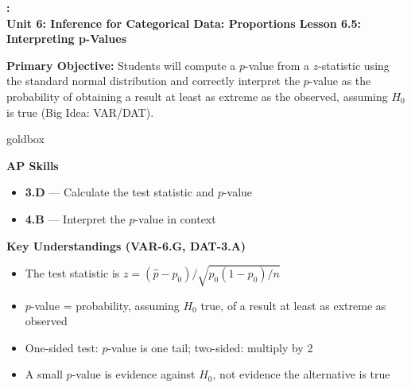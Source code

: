 \documentclass[10pt]{article}
\newcommand{\UnitNumberName}{Unit 6: Inference for Categorical Data: Proportions \quad}
\newcommand{\LessonNumberName}{Lesson 6.5: Interpreting p-Values}
\begin{document}
\begin{center}
    {\Large\bfseries \CourseName: \SchoolYear \\
    {\small\bfseries \UnitNumberName \LessonNumberName}}
\end{center}

\begin{tcolorbox}[colback=sky, colframe=navy, boxrule=0.9pt, arc=2mm,
    left=2mm, right=2mm, top=1.5mm, bottom=1.5mm]
    \textbf{Primary Objective:} Students will compute a $p$-value from a $z$-statistic
    using the standard normal distribution and correctly interpret the $p$-value as the
    probability of obtaining a result at least as extreme as the observed, assuming $H_0$
    is true (Big Idea: VAR/DAT).
\end{tcolorbox}

\renewcommand{\arraystretch}{1.6}
\begin{skillbox}{goldbox}
    \begin{minipage}[t]{0.48\linewidth}\vspace{0pt}
        \textbf{AP Skills}
        \begin{itemize}[leftmargin=1.2em]
            \item \textbf{3.D} --- Calculate the test statistic and $p$-value
            \item \textbf{4.B} --- Interpret the $p$-value in context
        \end{itemize}
    \end{minipage}\hfill
    \begin{minipage}[t]{0.48\linewidth}\vspace{0pt}
        \textbf{Key Understandings (VAR-6.G, DAT-3.A)}
        \begin{itemize}[leftmargin=1.2em]
            \item The test statistic is $z = (\hat p - p_0)/\sqrt{p_0(1-p_0)/n}$
            \item $p$-value = probability, assuming $H_0$ true, of a result at least as extreme as observed
            \item One-sided test: $p$-value is one tail; two-sided: multiply by 2
            \item A small $p$-value is evidence against $H_0$, not evidence the alternative is true
        \end{itemize}
    \end{minipage}
\end{skillbox}
\end{document}
